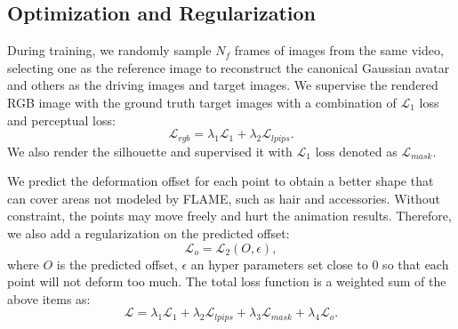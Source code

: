 \subsection{Optimization and Regularization}

During training, we randomly sample $N_f$ frames of images from the same video, selecting one as the reference image to reconstruct the canonical Gaussian avatar and others as the driving images and target images.
We supervise the rendered RGB image with the ground truth target images with a combination of $\mathcal{L}_1$ loss and perceptual loss:
\begin{equation}
    \mathcal{L}_{rgb} = \lambda_{1}\mathcal{L}_1 + \lambda_{2}\mathcal{L}_{lpips}.
\end{equation}
We also render the silhouette and supervised it with $\mathcal{L}_1$ loss denoted as $\mathcal{L}_{mask}$.

We predict the deformation offset for each point to obtain a better shape that can cover areas not modeled by FLAME, such as hair and accessories. Without constraint, the points may move freely and hurt the animation results. Therefore, we also add a regularization on the predicted offset:
\begin{equation}
    \mathcal{L}_{o} = \mathcal{L}_2(O, \epsilon),
\end{equation}
where $O$ is the predicted offset, $\epsilon$ an hyper parameters set close to 0 so that each point will not deform too much.
The total loss function is a weighted sum of the above items as:
\begin{equation}
    \mathcal{L} = \lambda_1\mathcal{L}_1 + \lambda_2\mathcal{L}_{lpips} + \lambda_3\mathcal{L}_{mask} + \lambda_4\mathcal{L}_{o}.
\end{equation}




